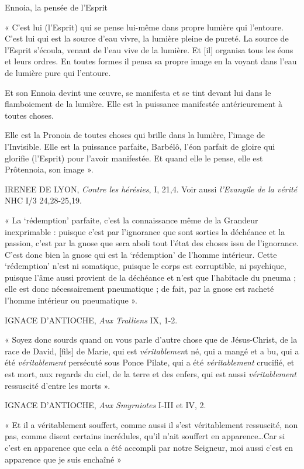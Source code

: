 Ennoia, la pensée de l'Esprit

« C'est lui (l'Esprit) qui se pense lui-même dans propre lumière qui
l'entoure. C'est lui qui est la source d'eau vivre, la lumière pleine de
pureté. La source de l'Esprit s'écoula, venant de l'eau vive de la
lumière. Et {[}il{]} organisa tous les éons et leurs ordres. En toutes
formes il pensa sa propre image en la voyant dans l'eau de lumière pure
qui l'entoure.

Et son Ennoia devint une œuvre, se manifesta et se tint devant lui dans
le flamboiement de la lumière. Elle est la puissance manifestée
antérieurement à toutes choses.

Elle est la Pronoia de toutes choses qui brille dans la lumière, l'image
de l'Invisible. Elle est la puissance parfaite, Barbélô, l'éon parfait
de gloire qui glorifie (l'Esprit) pour l'avoir manifestée. Et quand elle
le pense, elle est Prôtennoia, son image ».

IRENEE DE LYON, \emph{Contre les hérésies}, I, 21,4. Voir aussi
\emph{l'Evangile de la vérité} NHC I/3 24,28-25,19.

« La `rédemption' parfaite, c'est la connaissance même de la Grandeur
inexprimable : puisque c'est par l'ignorance que sont sorties la
déchéance et la passion, c'est par la gnose que sera aboli tout l'état
des choses issu de l'ignorance. C'est donc bien la gnose qui est la
`rédemption' de l'homme intérieur. Cette `rédemption' n'est ni
somatique, puisque le corps est corruptible, ni psychique, puisque l'âme
aussi provient de la déchéance et n'est que l'habitacle du pneuma ; elle
est donc nécessairement pneumatique ; de fait, par la gnose est racheté
l'homme intérieur ou pneumatique ».

IGNACE D'ANTIOCHE, \emph{Aux Tralliens} IX, 1-2.

« Soyez donc sourds quand on vous parle d'autre chose que de
Jésus-Christ, de la race de David, {[}fils{]} de Marie, qui est
\emph{véritablemen}t né, qui a mangé et a bu, qui a été
\emph{véritablement} persécuté sous Ponce Pilate, qui a été
\emph{véritablement} crucifié, et est mort, aux regards du ciel, de la
terre et des enfers, qui est aussi \emph{véritablement} ressuscité
d'entre les morts ».

IGNACE D'ANTIOCHE, \emph{Aux Smyrniotes} I-III et IV, 2.

« Et il a véritablement souffert, comme aussi il s'est véritablement
ressuscité, non pas, comme disent certains incrédules, qu'il n'ait
souffert en apparence\ldots Car si c'est en apparence que cela a été
accompli par notre Seigneur, moi aussi c'est en apparence que je suis
enchaîné »


